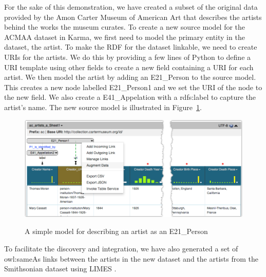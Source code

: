 For the sake of this demonstration, we have created a subset of the original data provided by the Amon Carter Museum of American Art that describes the artists behind the works the museum curates.  
To create a new source model for the ACMAA dataset in Karma, we first need to model the primary entity in the dataset, the artist.  To make the RDF for the dataset linkable, we need to create URIs for the artists.  
We do this by providing a few lines of Python to define a URI template using other fields to create a new field containing a URI for each artist.  We then model the artist by adding an E21\_Person to the source model.  
This creates a new node labelled E21\_Person1 and we set the URI of the node to the new field.  
We also create a E41\_Appelation with a rdfs:label to capture the artist's name.  
The new source model is illustrated in Figure~\ref{fig:simple-model-screenshot}. 


\begin{figure}
\begin{center}
\includegraphics[width=4.8in]{images/4-simple-model.png}
\vspace{-3mm}
\caption{A simple model for describing an artist as an E21\_Person}
\vspace{-2mm}
\label{fig:simple-model-screenshot}
\end{center}
\vspace{-1.5em}
\end{figure}




To facilitate the discovery and integration, we have also generated a set of owl:sameAs links between the artists in the new dataset and the artists from the Smithsonian dataset using LIMES \cite{ngomo2011limes}.

